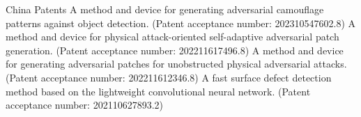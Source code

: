 
\begin{rubric}{China Patents}
\entry*[16/05/2023]
	A method and device for generating adversarial camouflage patterns against object detection. (Patent acceptance number: 202310547602.8)
\entry*[16/12/2022]
	A method and device for physical attack-oriented self-adaptive adversarial patch generation. (Patent acceptance number: 202211617496.8)
\entry*[15/12/2022]
	A method and device for generating adversarial patches for unobstructed physical adversarial attacks. (Patent acceptance number: 202211612346.8)
\entry*[05/06/2021]
	A fast surface defect detection method based on the lightweight convolutional neural network. (Patent acceptance number: 202110627893.2)
\end{rubric}
